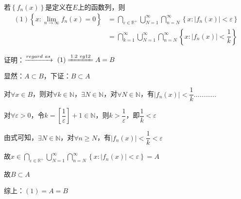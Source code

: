 \begin{eg}
    若$\left\{f_{n}(x)\right\} $是定义在$E$上的函数列，则 
    \begin{align*}
        (1)\left\{x : \lim \limits_{n \to \infty} f_{n}(x) = 0\right\} & = \bigcap \limits_{\varepsilon \in \mathbb{R}^{+}} \bigcup \limits_{N=1}^{\infty} \bigcap \limits_{n=N}^{\infty} \left\{x : \left\lvert f_{n}(x)\right\rvert < \varepsilon \right\} \\
        & = \bigcap \limits_{k=1}^{\infty} \bigcup \limits_{N=1}^{\infty} \bigcap \limits_{n=N}^{\infty}\left\{x : \left\lvert f_{n}(x)\right\rvert < \dfrac{1}{k} \right\}
    \end{align*}
\end{eg}
\noindent 证明：$\xrightarrow{regard \ as} \ (1) \xlongequal{1.2 \ eg12} A = B$
\par 显然：$A \subset B$，下证：$B \subset A$
\par 对$\forall x \in B$，则对$\forall k \in \mathbb{N}$，$\exists N \in \mathbb{N}$，对$\forall N \in \mathbb{N}$，有$\left\lvert f_{n}(x)\right\rvert < \dfrac{1}{k} \dots \dots \dots \dots $ 
\par 对$\forall \varepsilon > 0$，令$k = \left[\dfrac{1}{\varepsilon}\right] +1 \in \mathbb{N}$，则$k > \dfrac{1}{\varepsilon }$，即$\dfrac{1}{k} < \varepsilon $
\par 由式可知，$\exists N \in \mathbb{N}$，对$\forall n \geqslant N$，有$\left\lvert f_{n}(x)\right\rvert < \dfrac{1}{k} <\varepsilon $
\par 故$x \in \bigcap \limits_{\varepsilon \in \mathbb{R}^{+}} \bigcup \limits_{N=1}^{\infty} \bigcap \limits_{n=N}^{\infty} \left\{x : \left\lvert f_{n}(x)\right\rvert < \varepsilon \right\} = A$
\par 故$B \subset A$
\par 综上：$(1) = A = B$

